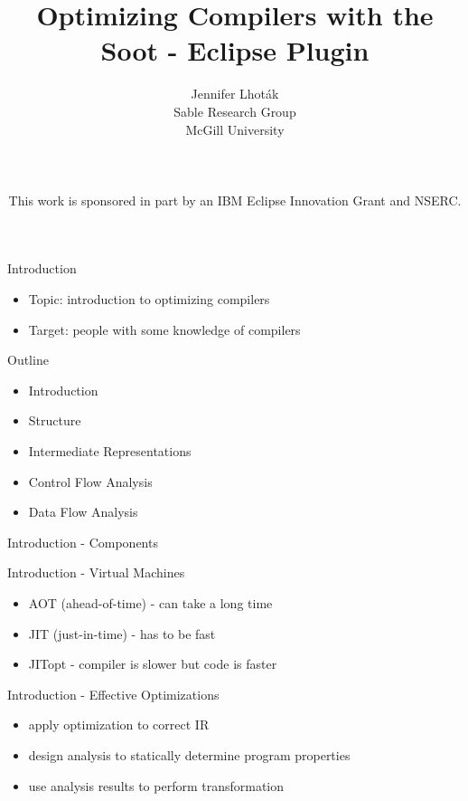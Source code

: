 \documentclass[mcgill,slideColor,colorBG,pdf]{prosper}
\title{Optimizing Compilers with the Soot - Eclipse Plugin}
\author{Jennifer Lhot\'ak\\
Sable Research Group\\
McGill University\\
\  \\
\  \\
\  \\
This work is sponsored in part by an IBM Eclipse Innovation Grant and NSERC.\\
}
\begin{document}
\maketitle

\begin{slide} {Introduction}
\begin{itemize}
\item Topic: introduction to optimizing compilers
\item Target: people with some knowledge of compilers
\end{itemize}
\end{slide}

\begin{slide} {Outline}
\begin{itemize}
\item Introduction 
\item Structure
\item Intermediate Representations
\item Control Flow Analysis
\item Data Flow Analysis
\end{itemize}
\end{slide}

\begin{slide} {Introduction - Components}
\end{slide}

\begin{slide} {Introduction - Virtual Machines}
\begin{itemize}
\item AOT (ahead-of-time) - can take a long time 
\item JIT (just-in-time) - has to be fast
\item JITopt - compiler is slower but code is faster
\end{itemize}
\end{slide}

\begin{slide} {Introduction - Effective Optimizations}
\begin{itemize}
\item apply optimization to correct IR
\item design analysis to statically determine program properties
\item use analysis results to perform transformation
\end{itemize}
\end{slide}
\end{document}
